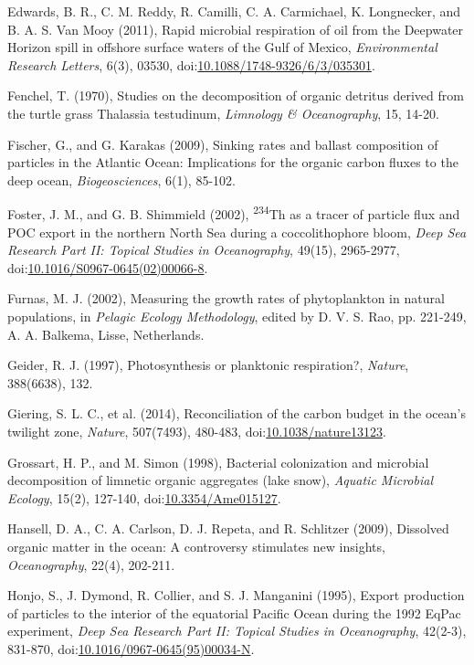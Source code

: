 \begin{singlespace}
{{Edwards, B. R., C. M. Reddy, R. Camilli, C. A. Carmichael, K. Longnecker, and B. A. S. Van Mooy (2011), Rapid microbial respiration of oil from the Deepwater Horizon spill in offshore surface waters of the Gulf of Mexico, \emph{Environmental Research Letters}, 6(3), 03530, doi:\href{http://dx.doi.org/10.1088/1748-9326/6/3/035301}{10.1088/1748-9326/6/3/035301}.

Fenchel, T. (1970), Studies on the decomposition of organic detritus derived from the turtle grass Thalassia testudinum, \emph{Limnology \& Oceanography}, 15, 14-20.

Fischer, G., and G. Karakas (2009), Sinking rates and ballast composition of particles in the Atlantic Ocean: Implications for the organic carbon fluxes to the deep ocean, \emph{Biogeosciences}, 6(1), 85-102.

Foster, J. M., and G. B. Shimmield (2002), \textsuperscript{234}Th as a tracer of particle flux and POC export in the northern North Sea during a coccolithophore bloom, \emph{Deep Sea Research Part II: Topical Studies in Oceanography}, 49(15), 2965-2977, doi:\href{http://dx.doi.org/10.1016/S0967-0645\%2802\%2900066-8}{10.1016/S0967-0645(02)00066-8}.

Furnas, M. J. (2002), Measuring the growth rates of phytoplankton in natural populations, in \emph{Pelagic Ecology Methodology}, edited by D. V. S. Rao, pp. 221-249, A. A. Balkema, Lisse, Netherlands.

Geider, R. J. (1997), Photosynthesis or planktonic respiration?, \emph{Nature}, 388(6638), 132.

Giering, S. L. C., et al. (2014), Reconciliation of the carbon budget in the ocean's twilight zone, \emph{Nature}, 507(7493), 480-483, doi:\href{http://dx.doi.org/10.1038/nature13123}{10.1038/nature13123}.

Grossart, H. P., and M. Simon (1998), Bacterial colonization and microbial decomposition of limnetic organic aggregates (lake snow), \emph{Aquatic Microbial Ecology}, 15(2), 127-140, doi:\href{http://dx.doi.org/10.3354/Ame015127}{10.3354/Ame015127}.

Hansell, D. A., C. A. Carlson, D. J. Repeta, and R. Schlitzer (2009), Dissolved organic matter in the ocean: A controversy stimulates new insights, \emph{Oceanography}, 22(4), 202-211.

Honjo, S., J. Dymond, R. Collier, and S. J. Manganini (1995), Export production of particles to the interior of the equatorial Pacific Ocean during the 1992 EqPac experiment, \emph{Deep Sea Research Part II: Topical Studies in Oceanography}, 42(2-3), 831-870, doi:\href{http://dx.doi.org/10.1016/0967-0645\%2895\%2900034-N}{10.1016/0967-0645(95)00034-N}.

}}
\end{singlespace}
